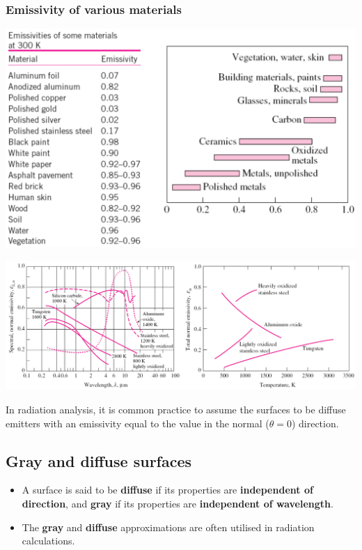 \documentclass[11pt]{article}
\begin{document}
\subsubsection{Emissivity of various materials}
\label{sec:org3a1f133}
\begin{center}
\includegraphics[width=.9\linewidth]{./images/emissivity-of-various-materials-table.png}
\end{center}
\begin{center}
\includegraphics[width=.9\linewidth]{./images/emissivity-of-various-materials-graph.png}
\end{center}

In radiation analysis, it is common practice to assume the surfaces to be diffuse emitters with an emissivity equal to the value in the normal (\(\theta = 0\)) direction.

\subsection{Gray and diffuse surfaces}
\label{sec:org21343fc}
\begin{itemize}
\item A surface is said to be \textbf{diffuse} if its properties are \textbf{independent of direction}, and \textbf{gray} if its properties are \textbf{independent of wavelength}.
\item The \textbf{gray} and \textbf{diffuse} approximations are often utilised in radiation calculations.
\end{itemize}
\end{document}
